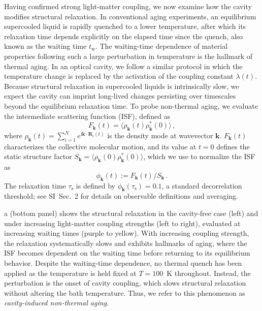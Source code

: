 \documentclass[aps, prl,
 reprint,
 superscriptaddress,
 citeautoscript,
 amsmath,amssymb,
 tightenlines
]{revtex4-2}
\begin{document}
Having confirmed strong light-matter coupling, we now examine how the cavity modifies structural relaxation. 
In conventional aging experiments, an equilibrium supercooled liquid is rapidly quenched to a lower temperature, after which its relaxation time depends explicitly on the elapsed time since the quench, also known as the waiting time $t_\mathrm{w}$. 
The waiting-time dependence of material properties following such a large perturbation in temperature is the hallmark of thermal aging. 
In an optical cavity, we follow a similar protocol in which the temperature change is replaced by the activation of the coupling constant $\lambda(t)$.  
Because structural relaxation in supercooled liquids is intrinsically slow, we expect the cavity can imprint long-lived changes persisting over timescales beyond the equilibrium relaxation time. 
To probe non-thermal aging, we evaluate the intermediate scattering function (ISF), defined as
\begin{equation}
F_{\bm{k}}(t) = \langle \rho_{\bm{k}}(t)\rho^*_{\bm k}(0) \rangle \,, \label{eq:ISF_equil}
\end{equation}
where $\rho_{\bm{k}}(t) = \sum_{i=1}^N e^{\mathrm{i} \bm{k} \cdot \bm{R}_i(t)}$ is the density mode at wavevector $\bm k$.  
$F_{\bm k}(t)$ characterizes the collective molecular motion, and its value at $t=0$ defines the static structure factor $S_{\bm k} = \langle \rho_{\bm{k}}(0)\rho^*_{\bm k}(0) \rangle$, which we use to normalize the ISF as  
\begin{equation}
\phi_{\bm k}(t) := F_{\bm{k}}(t)/S_{\bm k}\,.
\end{equation}
The relaxation time $\tau_\mathrm{s}$ is defined by $\phi_{\bm k}(\tau_\mathrm{s}) = 0.1$, a standard decorrelation threshold; see SI~Sec.~2 for details on observable definitions and averaging.  

a (bottom panel) shows the structural relaxation in the cavity-free case (left) and under increasing light-matter coupling strengths (left to right), evaluated at increasing waiting times (purple to yellow). With increasing coupling strength, the relaxation systematically slows and exhibits hallmarks of aging, where the ISF becomes dependent on the waiting time before returning to its equilibrium behavior. 
Despite the waiting-time dependence, no thermal quench has been applied as the temperature is held fixed at $T=100$~K throughout. 
Instead, the perturbation is the onset of cavity coupling, which slows structural relaxation without altering the bath temperature. 
Thus, we refer to this phenomenon as \textit{cavity-induced non-thermal aging}.
\end{document}
